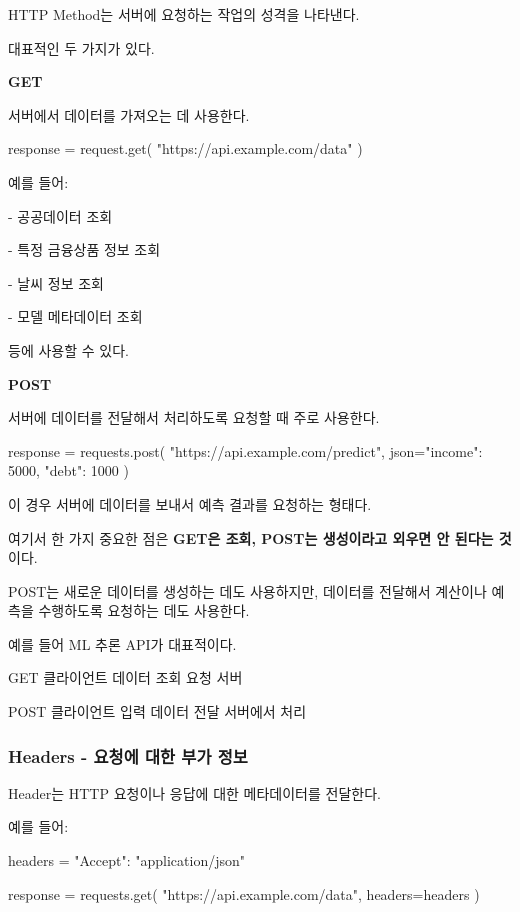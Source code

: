 HTTP Method는  서버에 요청하는 작업의 성격을 나타낸다.

대표적인 두 가지가 있다.

\textbf{GET}

서버에서 데이터를 가져오는 데 사용한다.

\begin{dhkcode}
response = request.get(
    "https://api.example.com/data"
)
\end{dhkcode}

예를 들어:

\begin{dhksmry}
    - 공공데이터 조회

    - 특정 금융상품 정보 조회

    - 날씨 정보 조회

    - 모델 메타데이터 조회
\end{dhksmry}

등에 사용할 수 있다.

\textbf{POST}

서버에 데이터를 전달해서 처리하도록 요청할 때 주로 사용한다.

\begin{dhkcode}
response = requests.post(
    "https://api.example.com/predict",
    json={"income": 5000, "debt": 1000}
)
\end{dhkcode}

이 경우 서버에 데이터를 보내서 예측 결과를 요청하는 형태다.

여기서 한 가지 중요한 점은 \textbf{GET은 조회, POST는 생성이라고 외우면 안 된다는 것}이다.

POST는 새로운 데이터를 생성하는 데도 사용하지만, 데이터를 전달해서 계산이나 예측을 수행하도록 요청하는 데도 사용한다.

예를 들어 ML 추론 API가 대표적이다.

\begin{dhksmry}
    GET
    클라이언트 \ra 데이터 조회 요청 \ra 서버

    POST
    클라이언트 \ra 입력 데이터 전달 \ra 서버에서 처리
\end{dhksmry}

\subsubsection{Headers - 요청에 대한 부가 정보}

Header는 HTTP 요청이나 응답에 대한 메타데이터를 전달한다.

예를 들어:

\begin{dhkcode}
headers = {
    "Accept": "application/json"
}

response = requests.get(
    "https://api.example.com/data",
    headers=headers
)
\end{dhkcode}

